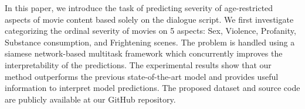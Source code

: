In this paper, we introduce the task of predicting severity of age-restricted aspects of movie content based solely on the dialogue script. We first investigate categorizing the ordinal severity of movies on 5 aspects: Sex, Violence, Profanity, Substance consumption, and Frightening scenes. The problem is handled using a siamese network-based multitask framework which concurrently improves the interpretability of the predictions. The experimental results show that our method outperforms the previous state-of-the-art model and provides useful information to interpret model predictions. The proposed dataset and source code are publicly available at our GitHub repository.
